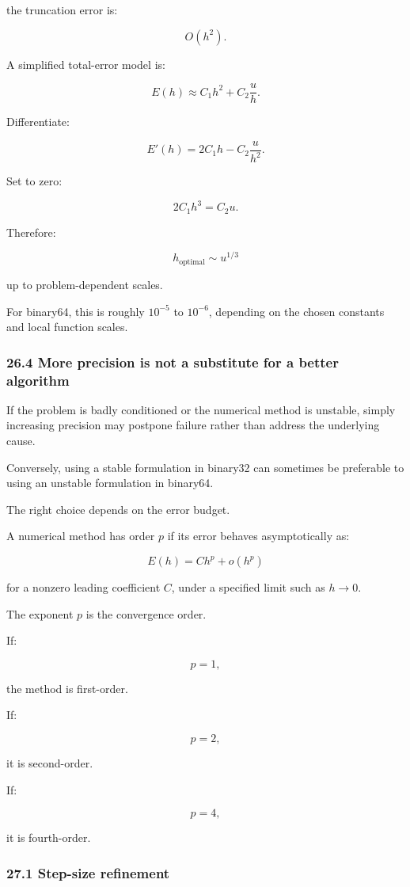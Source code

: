 the truncation error is:

\[ O(h^2). \]

A simplified total-error model is:

\[ \boxed{ E(h)\approx C_1h^2+C_2\frac uh }. \]

Differentiate:

\[ E'(h)=2C_1h-C_2\frac u{h^2}. \]

Set to zero:

\[ 2C_1h^3=C_2u. \]

Therefore:

\[ \boxed{ h_{\mathrm{optimal}}\sim u^{1/3} } \]

up to problem-dependent scales.

For binary64, this is roughly \(10^{-5}\) to \(10^{-6}\), depending on the chosen constants and local function scales.

\subsubsection{26.4 More precision is not a substitute for a better algorithm}\label{more-precision-is-not-a-substitute-for-a-better-algorithm}

If the problem is badly conditioned or the numerical method is unstable, simply increasing precision may postpone failure rather than address the underlying cause.

Conversely, using a stable formulation in binary32 can sometimes be preferable to using an unstable formulation in binary64.

The right choice depends on the error budget.

A numerical method has order \(p\) if its error behaves asymptotically as:

\[ \boxed{ E(h)=Ch^p+o(h^p) } \]

for a nonzero leading coefficient \(C\), under a specified limit such as \(h\to0\).

The exponent \(p\) is the convergence order.

If:

\[ p=1, \]

the method is first-order.

If:

\[ p=2, \]

it is second-order.

If:

\[ p=4, \]

it is fourth-order.

\subsubsection{27.1 Step-size refinement}\label{step-size-refinement}

